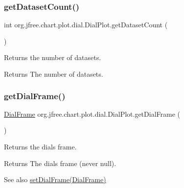 \subsubsection{\texorpdfstring{get\+Dataset\+Count()}{getDatasetCount()}}
{\footnotesize\ttfamily int org.\+jfree.\+chart.\+plot.\+dial.\+Dial\+Plot.\+get\+Dataset\+Count (\begin{DoxyParamCaption}{ }\end{DoxyParamCaption})}

Returns the number of datasets.

\begin{DoxyReturn}{Returns}
The number of datasets. 
\end{DoxyReturn}
\mbox{\label{classorg_1_1jfree_1_1chart_1_1plot_1_1dial_1_1_dial_plot_ad7f8de956f589e9503b74c8713f93145}} 
\subsubsection{\texorpdfstring{get\+Dial\+Frame()}{getDialFrame()}}
{\footnotesize\ttfamily \mbox{\hyperlink{interfaceorg_1_1jfree_1_1chart_1_1plot_1_1dial_1_1_dial_frame}{Dial\+Frame}} org.\+jfree.\+chart.\+plot.\+dial.\+Dial\+Plot.\+get\+Dial\+Frame (\begin{DoxyParamCaption}{ }\end{DoxyParamCaption})}

Returns the dial\textquotesingle{}s frame.

\begin{DoxyReturn}{Returns}
The dial\textquotesingle{}s frame (never {\ttfamily null}).
\end{DoxyReturn}
\begin{DoxySeeAlso}{See also}
\mbox{\hyperlink{classorg_1_1jfree_1_1chart_1_1plot_1_1dial_1_1_dial_plot_a02b28d69fba2ec6dfa3420b29213f51d}{set\+Dial\+Frame(\+Dial\+Frame)}} 
\end{DoxySeeAlso}
\mbox{\label{classorg_1_1jfree_1_1chart_1_1plot_1_1dial_1_1_dial_plot_ac233dcdea31b7587dddce3afb5f8bd5f}} 
